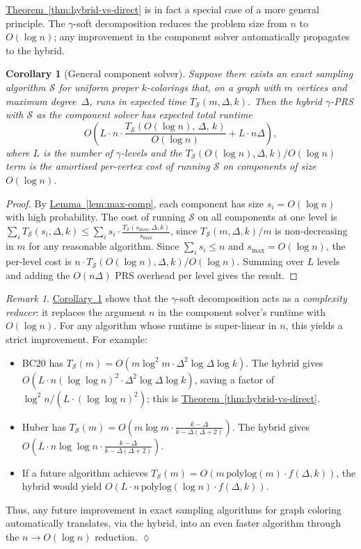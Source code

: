 \documentclass[12pt, a4paper]{article}
\theoremstyle{plain}
\newtheorem{corollary}{Corollary}
\theoremstyle{definition}
\theoremstyle{remark}
\newtheorem{remark}{Remark}
\newcommand{\mc}{\mathcal}
\newcommand{\lt}{\left}
\newcommand{\rt}{\right}
\newcommand{\sref}[2]{\hyperref[#2]{#1~\ref*{#2}}}
\begin{document}
\sref{Theorem}{thm:hybrid-vs-direct} is in fact a special case of a more general principle. The \(\gamma\)-soft decomposition reduces the problem size from \(n\) to \(O(\log n)\); any improvement in the component solver automatically propagates to the hybrid.

\begin{corollary}[General component solver]\label{cor:general-solver}
Suppose there exists an exact sampling algorithm \(\mc S\) for uniform proper \(k\)-colorings that, on a graph with \(m\) vertices and maximum degree~\(\Delta\), runs in expected time \(T_{\mc S}(m,\Delta,k)\). Then the hybrid \(\gamma\)-PRS with \(\mc S\) as the component solver has expected total runtime
\[
O\!\lt(L\cdot n\cdot\frac{T_{\mc S}(O(\log n),\,\Delta,\,k)}{O(\log n)} + L\cdot n\Delta\rt),
\]
where \(L\) is the number of \(\gamma\)-levels and the \(T_{\mc S}(O(\log n),\Delta,k)/O(\log n)\) term is the amortised per-vertex cost of running \(\mc S\) on components of size \(O(\log n)\).
\end{corollary}
\begin{proof}
By \sref{Lemma}{lem:max-comp}, each component has size \(s_i = O(\log n)\) with high probability. The cost of running \(\mc S\) on all components at one level is \(\sum_i T_{\mc S}(s_i,\Delta,k) \leq \sum_i s_i \cdot \frac{T_{\mc S}(s_{\max},\Delta,k)}{s_{\max}}\), since \(T_{\mc S}(m,\Delta,k)/m\) is non-decreasing in \(m\) for any reasonable algorithm. Since \(\sum_i s_i \leq n\) and \(s_{\max} = O(\log n)\), the per-level cost is \(n\cdot T_{\mc S}(O(\log n),\Delta,k)/O(\log n)\). Summing over \(L\) levels and adding the \(O(n\Delta)\) PRS overhead per level gives the result.
\end{proof}

\begin{remark}\normalfont
\sref{Corollary}{cor:general-solver} shows that the \(\gamma\)-soft decomposition acts as a {\em complexity reducer}: it replaces the argument \(n\) in the component solver's runtime with \(O(\log n)\). For any algorithm whose runtime is super-linear in \(n\), this yields a strict improvement. For example:
\begin{itemize}
\item BC20 \citep{BC20} has \(T_{\mc S}(m) = O(m\log^2 m\cdot\Delta^2\log\Delta\log k)\). The hybrid gives \(O(L\cdot n(\log\log n)^2\cdot\Delta^2\log\Delta\log k)\), saving a factor of \(\log^2 n/(L\cdot(\log\log n)^2)\); this is \sref{Theorem}{thm:hybrid-vs-direct}.
\item Huber \citep{MH96} has \(T_{\mc S}(m) = O(m\log m\cdot\frac{k-\Delta}{k-\Delta(\Delta+2)})\). The hybrid gives \(O(L\cdot n\log\log n\cdot\frac{k-\Delta}{k-\Delta(\Delta+2)})\).
\item If a future algorithm achieves \(T_{\mc S}(m) = O(m\,\mathrm{polylog}(m)\cdot f(\Delta,k))\), the hybrid would yield \(O(L\cdot n\,\mathrm{polylog}(\log n)\cdot f(\Delta,k))\).
\end{itemize}
Thus, any future improvement in exact sampling algorithms for graph coloring automatically translates, via the hybrid, into an even faster algorithm through the \(n\to O(\log n)\) reduction.
\hfill\(\lozenge\)
\end{remark}
\end{document}
